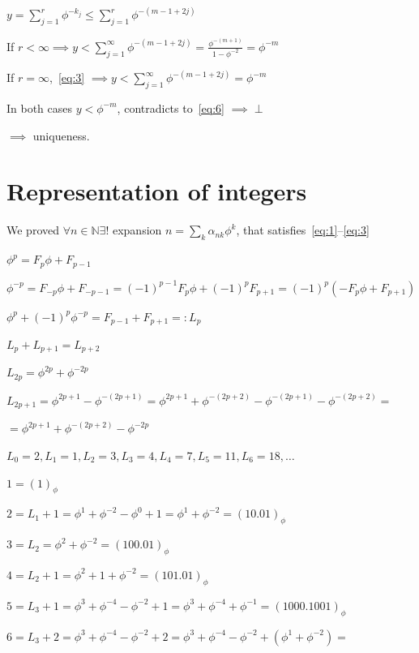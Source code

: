 \documentclass{article}
\begin{document}
\( y = \sum_{j = 1}^{r} \phi^{-k_{j}} \leq \sum_{j = 1}^{r} \phi^{-(m-1+2j)} \)

If \( r < \infty \implies y < \sum_{j = 1}^\infty \phi^{-(m-1+2j)} = \frac{\phi^{-(m+1)}}{1-\phi^{-2}} = \phi^{-m} \)

If \( r = \infty \),~\eqref{eq:3} \( \implies y < \sum_{j = 1}^\infty \phi^{-(m-1+2j)} = \phi^{-m} \)

In both cases \( y < \phi^{-m} \), contradicts to~\eqref{eq:6} \( \implies \perp \)

\( \implies \) uniqueness.

\section*{Representation of integers}

We proved \( \forall n \in \mathbb{N} \exists! \) expansion \( n = \sum_{k} \alpha_{nk} \phi^{k} \), that satisfies~\eqref{eq:1}--\eqref{eq:3}

\( \phi^{p} = F_{p} \phi + F_{p-1} \)

\( \phi^{-p} = F_{-p} \phi + F_{-p-1} = {(-1)}^{p-1}F_{p} \phi + {(-1)}^{p}F_{p+1} = {(-1)}^{p}(-F_{p}\phi + F_{p+1}) \)

\( \phi^{p} + {(-1)}^{p}\phi^{-p} = F_{p-1} + F_{p+1} =: L_{p} \)

\( L_{p} + L_{p+1} = L_{p+2} \)

\( L_{2p} = \phi^{2p} + \phi^{-2p} \)

\( L_{2p+1} = \phi^{2p+1} - \phi^{-(2p+1)} = \phi^{2p+1} + \phi^{-(2p+2)} - \phi^{-(2p+1)} - \phi^{-(2p+2)} = \)

\( = \phi^{2p+1} + \phi^{-(2p+2)} - \phi^{-2p} \)

\( L_{0} = 2, L_{1} = 1, L_{2} = 3, L_{3} = 4, L_{4} = 7, L_{5} = 11, L_{6} = 18, \ldots \)

\( 1 = {(1)}_\phi \)

\( 2 = L_{1} + 1 = \phi^{1} + \phi^{-2} - \phi^{0} + 1 = \phi^{1} + \phi^{-2} = {(10.01)}_\phi \)

\( 3 = L_{2} = \phi^{2} + \phi^{-2} = {(100.01)}_\phi \)

\( 4 = L_{2} + 1= \phi^{2} + 1 + \phi^{-2} = {(101.01)}_\phi \)

\( 5 = L_{3} + 1 = \phi^{3} + \phi^{-4} - \phi^{-2} + 1 = \phi^{3} + \phi^{-4} + \phi^{-1} = {(1000.1001)}_\phi \)

\( 6 = L_{3} + 2 = \phi^{3} + \phi^{-4} - \phi^{-2} + 2 = \phi^{3} + \phi^{-4} - \phi^{-2} + (\phi^{1} + \phi^{-2}) = \)
\end{document}
